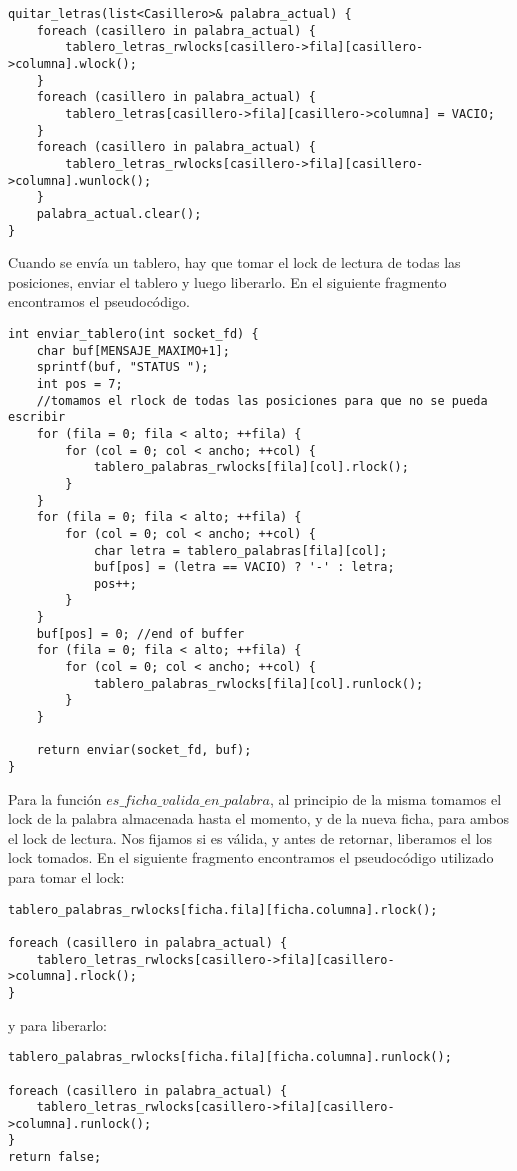 \begin{lstlisting}
quitar_letras(list<Casillero>& palabra_actual) {
    foreach (casillero in palabra_actual) {
        tablero_letras_rwlocks[casillero->fila][casillero->columna].wlock();
    }
    foreach (casillero in palabra_actual) {
        tablero_letras[casillero->fila][casillero->columna] = VACIO;
    }
    foreach (casillero in palabra_actual) {
        tablero_letras_rwlocks[casillero->fila][casillero->columna].wunlock();
    }
    palabra_actual.clear();
}
\end{lstlisting}

Cuando se envía un tablero, hay que tomar el lock de lectura de todas las posiciones, enviar el tablero y luego liberarlo. En el siguiente fragmento encontramos el pseudocódigo.

\begin{lstlisting}
int enviar_tablero(int socket_fd) {
    char buf[MENSAJE_MAXIMO+1];
    sprintf(buf, "STATUS ");
    int pos = 7;
    //tomamos el rlock de todas las posiciones para que no se pueda escribir
    for (fila = 0; fila < alto; ++fila) {
        for (col = 0; col < ancho; ++col) {
            tablero_palabras_rwlocks[fila][col].rlock();
        }
    }
    for (fila = 0; fila < alto; ++fila) {
        for (col = 0; col < ancho; ++col) {
            char letra = tablero_palabras[fila][col];
            buf[pos] = (letra == VACIO) ? '-' : letra;
            pos++;
        }
    }
    buf[pos] = 0; //end of buffer
    for (fila = 0; fila < alto; ++fila) {
        for (col = 0; col < ancho; ++col) {
            tablero_palabras_rwlocks[fila][col].runlock();
        }
    }

    return enviar(socket_fd, buf);
}
\end{lstlisting}

Para la función $ es\_ficha\_valida\_en\_palabra $, al principio de la misma tomamos el lock de la palabra almacenada hasta el momento, y de la nueva ficha, para ambos el lock de lectura. Nos fijamos si es válida, y antes de retornar, liberamos el los lock tomados. En el siguiente fragmento encontramos el pseudocódigo utilizado para tomar el lock:

\begin{lstlisting}
tablero_palabras_rwlocks[ficha.fila][ficha.columna].rlock();

foreach (casillero in palabra_actual) {
    tablero_letras_rwlocks[casillero->fila][casillero->columna].rlock();
}
\end{lstlisting}


y para liberarlo:

\begin{lstlisting}
tablero_palabras_rwlocks[ficha.fila][ficha.columna].runlock();

foreach (casillero in palabra_actual) {
    tablero_letras_rwlocks[casillero->fila][casillero->columna].runlock();
}
return false;
\end{lstlisting}
